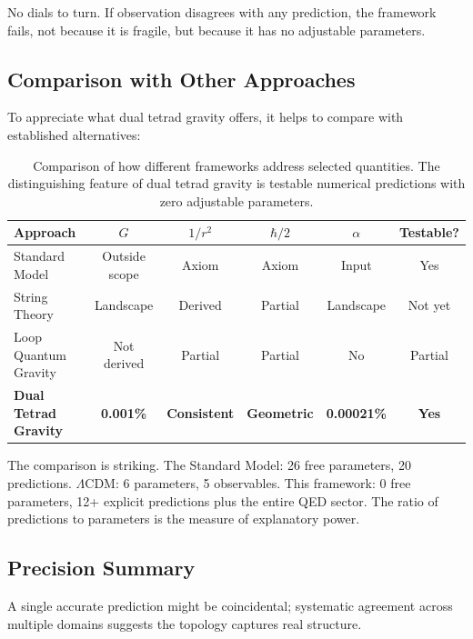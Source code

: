 \documentclass[aps,prd,preprint,superscriptaddress,showpacs,preprintnumbers,amsmath,amssymb,nofootinbib]{revtex4-2}
\begin{document}
No dials to turn. If observation disagrees with any prediction, the framework fails, not because it is fragile, but because it has no adjustable parameters.

\subsection{Comparison with Other Approaches}
\label{subsec:comparison}

To appreciate what dual tetrad gravity offers, it helps to compare with established alternatives:

\begin{table}[H]
\centering
\small
\begin{tabular*}{\textwidth}{@{\extracolsep{\fill}} lccccc @{}}
\toprule
\textbf{Approach} & \textbf{$G$} & \textbf{$1/r^2$} & \textbf{$\hbar/2$} & \textbf{$\alpha$} & \textbf{Testable?} \\
\midrule
Standard Model & Outside scope & Axiom & Axiom & Input & Yes \\
String Theory & Landscape & Derived & Partial & Landscape & Not yet \\
Loop Quantum Gravity & Not derived & Partial & Partial & No & Partial \\
\textbf{Dual Tetrad Gravity} & \textbf{0.001\%} & \textbf{Consistent} & \textbf{Geometric} & \textbf{0.00021\%} & \textbf{Yes} \\
\bottomrule
\end{tabular*}
\caption{Comparison of how different frameworks address selected quantities. The distinguishing feature of dual tetrad gravity is testable numerical predictions with zero adjustable parameters.}
\label{tab:comparison}
\end{table}

The comparison is striking. The Standard Model: 26 free parameters, 20 predictions. $\Lambda$CDM: 6 parameters, 5 observables. This framework: 0 free parameters, 12+ explicit predictions plus the entire QED sector. The ratio of predictions to parameters is the measure of explanatory power.

\subsection{Precision Summary}
\label{subsec:precision}

A single accurate prediction might be coincidental; systematic agreement across multiple domains suggests the topology captures real structure.
\end{document}
